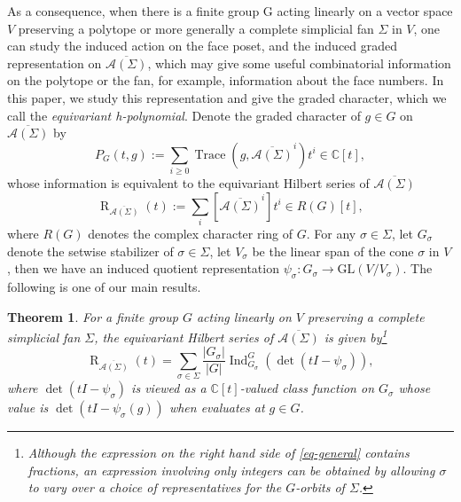 \documentclass{amsart}
\newtheorem{theorem}{Theorem}[section]
\theoremstyle{definition}
\theoremstyle{remark}
\numberwithin{equation}{section}
\begin{document}
As a consequence, when there is a finite group G acting linearly on a vector space $V$ preserving a polytope or more generally a complete simplicial fan $\Sigma$ in $V$, one can study the induced action on the face poset, and the induced graded representation on $\overline{\mathcal{A}(\Sigma)}$, which may give some useful combinatorial information on the polytope or the fan, for example, information about the face numbers. In this paper, we study this representation and give the graded character, which we call the \emph{equivariant h-polynomial}. Denote the graded character of $g \in G$ on ${\overline{\mathcal{A}(\Sigma)}}$ by 
\begin{equation} \label{eq-def of graded cha}
P_G(t, g):=\sum_{i \geqslant 0} \operatorname{Trace}\left(g, \overline{\mathcal{A}(\Sigma)}^{i}\right) t^i \in \mathbb{C}[t],    
\end{equation}
whose information is equivalent to the equivariant Hilbert series of $\overline{\mathcal{A}(\Sigma)}$
$$
\operatorname{R}_{\overline{\mathcal{A}(\Sigma)}}(t):=\sum_i [\overline{\mathcal{A}(\Sigma)}^{i}] t^i \in R(G)[t],
$$
where $R(G)$ denotes the complex character ring of $G$. For any $\sigma \in \Sigma$, let $G_{\sigma }$ denote the setwise stabilizer of $\sigma \in \Sigma$, let $V_\sigma$ be the linear span of the cone $\sigma$ in $V$, then we have an induced quotient representation $\psi_{\sigma}: G_{\sigma} \rightarrow \mathrm{GL}\left(V/ V_\sigma\right)$. 
The following is one of our main results.

\begin{theorem} \label{thm-main}
For a finite group $G$ acting linearly on $V$ preserving a complete simplicial fan $\Sigma$, the equivariant Hilbert series of $\overline{\mathcal{A}(\Sigma)}$ is given by\footnote{Although the expression on the right hand side of \eqref{eq-general} contains fractions, an expression involving only integers can be obtained by allowing $\sigma$ to vary over a choice of representatives for the $G$-orbits of $\Sigma$.}
\begin{equation} \label{eq-general}
   \operatorname{R}_{\overline{\mathcal{A}(\Sigma)}}(t)=\sum_{\sigma \in \Sigma} \frac{\left|G_{\sigma }\right|}{\left|G\right|} \operatorname{Ind}_{G_{\sigma}}^{G}\left(\operatorname{det}(tI-\psi_\sigma)\right),
\end{equation}
where $\operatorname{det}(tI-\psi_\sigma)$ is viewed as a $\mathbb{C}[t]$-valued class function on $G_{\sigma }$ whose value is $\operatorname{det}(tI-\psi_\sigma(g))$ when evaluates at $g \in G$.
\end{theorem}
\end{document}
